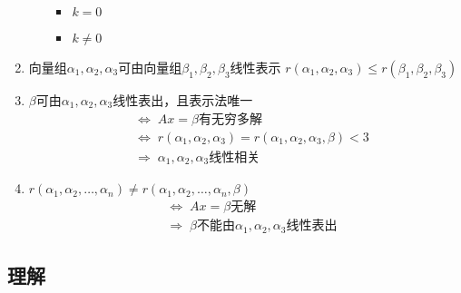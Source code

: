 \documentclass[a4paper,12pt]{article}
\begin{document}
\begin{enumerate}
\begin{enumerate}
            \begin{itemize}
                \item $k = 0$ \Rightarrow {}
                \item $k \neq 0$ \Rightarrow {}
            \end{itemize}
        \end{enumerate}
        \item 向量组$\alpha_1, \alpha_2, \alpha_3$可由向量组$\beta_1, \beta_2, \beta_3$线性表示 \;\Rightarrow\; $r(\alpha_1, \alpha_2, \alpha_3) \le r(\beta_1, \beta_2, \beta_3)$
        \item $\beta$可由$\alpha_1, \alpha_2, \alpha_3$线性表出，且表示法{\color{red}{不}}唯一
        \begin{align*}
            &\Leftrightarrow\; Ax = \beta\text{有无穷多解} \\
            &\Leftrightarrow\; r(\alpha_1, \alpha_2, \alpha_3) = r(\alpha_1, \alpha_2, \alpha_3, \beta) < 3 \\
            &\Rightarrow\; \alpha_1, \alpha_2, \alpha_3\text{线性相关}
        \end{align*}
        \item $r(\alpha_1, \alpha_2, \dots, \alpha_n) \neq r(\alpha_1, \alpha_2, \dots, \alpha_n, \beta)$
        \begin{align*}
            &\Leftrightarrow\; Ax = \beta\text{无解} \\
            &\Rightarrow\; \beta\text{不能由}\alpha_1, \alpha_2, \alpha_3\text{线性表出}
        \end{align*}
    \end{enumerate}

    \subsection{理解}
\end{document}
